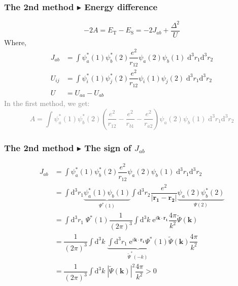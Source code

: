 \documentclass{beamer}
\begin{document}
  \begin{frame}
    \frametitle{The 2nd method \(\blacktriangleright\) Energy difference}
    \begin{equation*}
      -2A = E_\text{T} - E_\text{S} = -2J_{ab} + \dfrac{\Delta^2}{U}
    \end{equation*}
    Where,
    \begin{subequations}
      \label{eq::defJU}
      \begin{align}
        J_{ab} &= \int \psi_a^*(1)\psi_b^*(2)\dfrac{e^2}{r_{12}}\psi_a(2)\psi_b(1)\;\mathrm{d}^3r_1\mathrm{d}^3r_2\\
        U_{ij} &= \int \psi_i^*(1)\psi_j^*(2)\dfrac{e^2}{r_{12}}\psi_i(1)\psi_j(2)\;\mathrm{d}^3r_1\mathrm{d}^3r_2\\
        U &= U_{aa} - U_{ab}
      \end{align}
    \end{subequations}
   \textcolor{gray}{In the first method, we get:
   \begin{equation*}
    A = \int \psi_a^*(1)\psi_b^*(2)\left(\dfrac{e^2}{r_{12}} - \dfrac{e^2}{r_{b1}} - \dfrac{e^2}{r_{a2}}\right)\psi_a(2)\psi_b(1)\;\mathrm{d}^3r_1\mathrm{d}^3r_2
   \end{equation*}}
  \end{frame}

  \begin{frame}
    \frametitle{The 2nd method \(\blacktriangleright\) The sign of \(J_{ab}\)}
    \begin{equation}
      \begin{aligned}
        J_{ab} &= \int \psi_a^*(1)\psi_b^*(2)\dfrac{e^2}{r_{12}}\psi_a(2)\psi_b(1)\;\mathrm{d}^3r_1\mathrm{d}^3r_2\\
        &= \int \mathrm{d}^3r_1 \underbrace{\psi_a^*(1)\psi_b(1)}_{\Psi^*(1)} \int \mathrm{d}^3r_2 \dfrac{e^2}{|\bm{r_1} - \bm{r_2}|}\underbrace{\psi_a(2)\psi_b^*(2)}_{\Psi(2)}\\
        &= \int \mathrm{d}^3r_1\; \Psi^*(1) \dfrac{1}{(2\pi)^3}\int \mathrm{d}^3k\; \mathrm{e}^{i\bm{k}\cdot\bm{r_1}} \dfrac{4\pi}{k^2} \widetilde{\Psi}(\bm{k})\\
        &= \dfrac{1}{(2\pi)^3}\int \mathrm{d}^3k\; \underbrace{\int \mathrm{d}^3r_1\; \mathrm{e}^{i\bm{k}\cdot\bm{r_1}}\Psi^*(1)}_{\widetilde{\Psi}^*(-k)} \widetilde{\Psi}(\bm{k})\dfrac{4\pi}{k^2}\\
        &= \dfrac{1}{(2\pi)^3}\int \mathrm{d}^3k\; \left|\widetilde{\Psi}(\bm{k})\right|^2\dfrac{4\pi}{k^2} > 0 
      \end{aligned}
    \end{equation}
  \end{frame}
\end{document}
